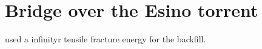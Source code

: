\section{Bridge over the Esino torrent}

\cite{Caddemi2018} used a infinityr tensile fracture energy for the backfill.

\cite{Caddemi2019MAB}
\cite{Caddemi2019DMEM}